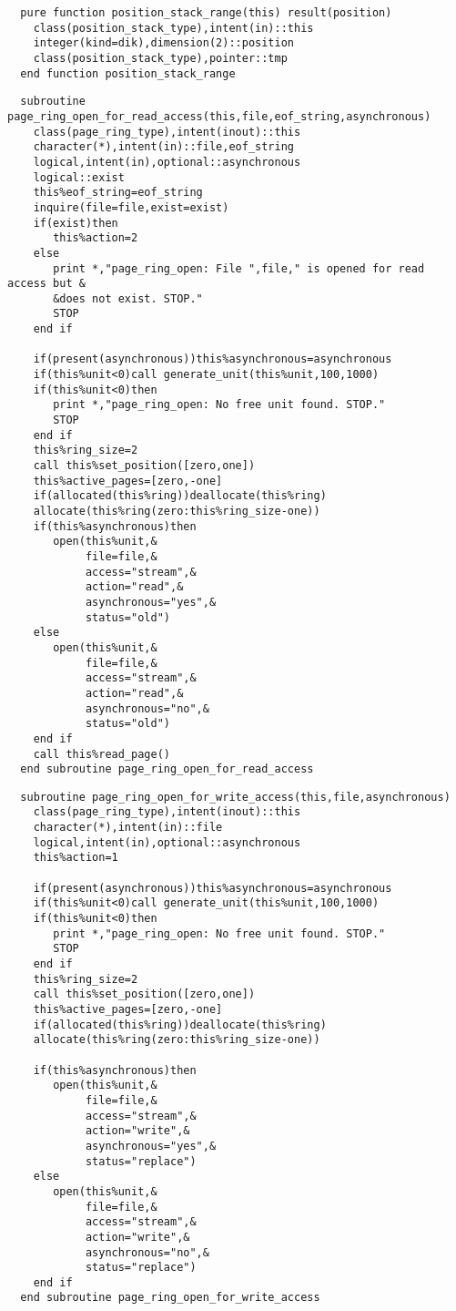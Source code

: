 \begin{Verbatim}
  pure function position_stack_range(this) result(position)
    class(position_stack_type),intent(in)::this
    integer(kind=dik),dimension(2)::position
    class(position_stack_type),pointer::tmp
  end function position_stack_range
\end{Verbatim}
\begin{Verbatim}
  subroutine page_ring_open_for_read_access(this,file,eof_string,asynchronous)
    class(page_ring_type),intent(inout)::this
    character(*),intent(in)::file,eof_string
    logical,intent(in),optional::asynchronous
    logical::exist
    this%eof_string=eof_string
    inquire(file=file,exist=exist)
    if(exist)then
       this%action=2
    else
       print *,"page_ring_open: File ",file," is opened for read access but &
       &does not exist. STOP."
       STOP
    end if

    if(present(asynchronous))this%asynchronous=asynchronous
    if(this%unit<0)call generate_unit(this%unit,100,1000)
    if(this%unit<0)then
       print *,"page_ring_open: No free unit found. STOP."
       STOP
    end if
    this%ring_size=2
    call this%set_position([zero,one])
    this%active_pages=[zero,-one]
    if(allocated(this%ring))deallocate(this%ring)
    allocate(this%ring(zero:this%ring_size-one))
    if(this%asynchronous)then
       open(this%unit,&
            file=file,&
            access="stream",&
            action="read",&
            asynchronous="yes",&
            status="old")
    else
       open(this%unit,&
            file=file,&
            access="stream",&
            action="read",&
            asynchronous="no",&
            status="old")
    end if
    call this%read_page()
  end subroutine page_ring_open_for_read_access
\end{Verbatim}

\begin{Verbatim}
  subroutine page_ring_open_for_write_access(this,file,asynchronous)
    class(page_ring_type),intent(inout)::this
    character(*),intent(in)::file
    logical,intent(in),optional::asynchronous
    this%action=1

    if(present(asynchronous))this%asynchronous=asynchronous
    if(this%unit<0)call generate_unit(this%unit,100,1000)
    if(this%unit<0)then
       print *,"page_ring_open: No free unit found. STOP."
       STOP
    end if
    this%ring_size=2
    call this%set_position([zero,one])
    this%active_pages=[zero,-one]
    if(allocated(this%ring))deallocate(this%ring)
    allocate(this%ring(zero:this%ring_size-one))

    if(this%asynchronous)then
       open(this%unit,&
            file=file,&
            access="stream",&
            action="write",&
            asynchronous="yes",&
            status="replace")
    else
       open(this%unit,&
            file=file,&
            access="stream",&
            action="write",&
            asynchronous="no",&
            status="replace")
    end if
  end subroutine page_ring_open_for_write_access
\end{Verbatim}

